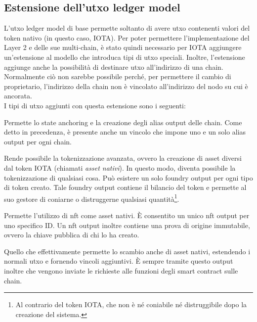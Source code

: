 \documentclass[12pt,a4paper,openright,twoside]{report}
\begin{document}
\subsection{Estensione dell'\acrshort{utxo} ledger model}
\label{utxo_extension}
L'\acrshort{utxo} ledger model di base permette soltanto di avere \acrshort{utxo} contenenti valori del token nativo (in questo caso, IOTA). Per poter permettere l'implementazione del Layer 2 e delle sue multi-chain, è stato quindi necessario per IOTA aggiungere un'estensione al modello che introduca tipi di \acrshort{utxo} speciali. Inoltre, l'estensione aggiunge anche la possibilità di destinare \acrshort{utxo} all'indirizzo di una chain. Normalmente ciò non sarebbe possibile perché, per permettere il cambio di proprietario, l'indirizzo della chain non è vincolato all'indirizzo del nodo su cui è ancorata.\\
I tipi di \acrshort{utxo} aggiunti con questa estensione sono i seguenti:

\begin{description}[font=$\bullet$\:\:,leftmargin=\parindent,labelindent=\parindent]
  \item[Alias output] Permette lo state anchoring e la creazione degli alias output delle chain. Come detto in precedenza, è presente anche un vincolo che impone uno e un solo alias output per ogni chain.
  \item[Foundry output] Rende possibile la tokenizzazione avanzata, ovvero la creazione di asset diversi dal token IOTA (chiamati \textit{asset nativi}). In questo modo, diventa possibile la tokenizzazione di qualsiasi cosa. Può esistere un solo foundry output per ogni tipo di token creato. Tale foundry output contiene il bilancio del token e permette al suo gestore di coniarne o distruggerne qualsiasi quantità\footnote{Al contrario del token IOTA, che non è né coniabile né distruggibile dopo la creazione del sistema.}.
  \item[\acrshort{nft} output] Permette l'utilizzo di \acrfull{nft} come asset nativi. È consentito un unico \acrshort{nft} output per uno specifico ID. Un \acrshort{nft} output inoltre contiene una prova di origine immutabile, ovvero la chiave pubblica di chi lo ha creato.
  \item[Extended value transfer output] Quello che effettivamente permette lo scambio anche di asset nativi, estendendo i normali \acrshort{utxo} e fornendo vincoli aggiuntivi. È sempre tramite questo output inoltre che vengono inviate le richieste alle funzioni degli smart contract sulle chain.
\end{description}
\end{document}
